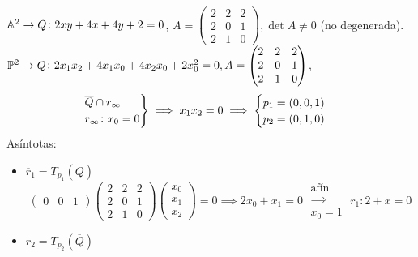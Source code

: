 \begin{example}
    $\mathbb{A}^2 \to Q \colon 2xy + 4x +4y +2 = 0$,
    $A = \left( \begin{array}{c|cc}
        2 & 2 & 2 \\ \hline
        2 & 0 & 1 \\
        2 & 1 & 0
    \end{array} \right), \det A \neq 0$ (no degenerada). \\
    $\mathbb{P}^2 \to Q \colon 2x_1x_2 + 4x_1x_0 + 4x_2x_0 + 2x_0^2 = 0,
    A = \begin{pmatrix}
        2 & 2 & 2 \\
        2 & 0 & 1 \\
        2 & 1 & 0
    \end{pmatrix}$,
    \begin{gather*}
        \begin{rcases}
            \overline{Q} \cap r_\infty \\
            r_\infty \colon x_0 = 0
        \end{rcases}
        \implies x_1x_2 = 0 \implies
        \begin{cases}
            p_1 = \left( 0,0,1 \right) \\
            p_2 = \left( 0,1,0 \right)
        \end{cases}
    \end{gather*}
    Asíntotas:
    \begin{itemize}
        \item $\overline{r}_1 = T_{p_1}\left( \overline{Q} \right)$
            \[
                \begin{pmatrix}
                    0 & 0 & 1
                \end{pmatrix}
                \begin{pmatrix}
                    2 & 2 & 2 \\
                    2 & 0 & 1 \\
                    2 & 1 & 0
                \end{pmatrix}
                \begin{pmatrix}
                    x_0 \\ x_1 \\ x_2
                \end{pmatrix}
                = 0 \implies 2x_0 + x_1 = 0 \;\substack{\text{afín} \\ \implies \\ x_0 = 1}\; r_1 \colon 2 + x = 0
            \]
        \item $\overline{r}_2 = T_{p_2}\left( \overline{Q} \right)$

\end{itemize}
\end{example}
